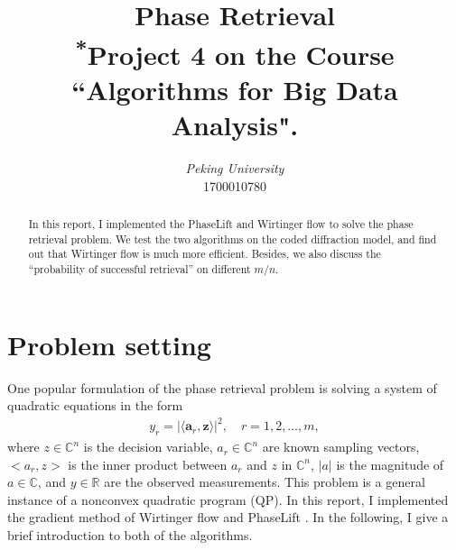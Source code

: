 \documentclass[conference,onecolumn,12pt]{IEEEtran}
\newcommand{\abs}[1]{\left|#1\right|}
\newcommand{\<}{\langle}
\renewcommand{\>}{\rangle}
\newcommand{\vct}[1]{\bm{#1}}
\numberwithin{equation}{section}
\begin{document}
\title{Phase Retrieval\\
{\footnotesize \textsuperscript{*}Project 4 on the Course ``Algorithms for Big Data Analysis".}
}

\author{
\textit{Peking University}\\
1700010780}
\date{}

\maketitle
\thispagestyle{fancy} %
\lhead{} %
\chead{} %
\rhead{} %
\lfoot{} %
\cfoot{} %
\cfoot{\thepage} %
\renewcommand{\headrulewidth}{0pt} %
\renewcommand{\footrulewidth}{1pt} %
\pagestyle{fancy}
\cfoot{\thepage}


\begin{abstract}
  In this report, I implemented the PhaseLift \cite{candes2013phase} and Wirtinger flow \cite{candes2015phase} to solve the phase retrieval problem. We test the two algorithms on the coded diffraction model, and find out that Wirtinger flow is much more efficient. Besides, we also discuss the ``probability of successful retrieval'' on different $m/n$.
\end{abstract}


\tableofcontents
\newpage
\section{Problem setting}
One popular formulation of the phase retrieval problem is solving a system of quadratic equations in the form
\begin{align}
\label{quadeq}
y_r=\abs{\<\vct{a}_r, \vct{z}\>}^2,\quad r=1,2,\ldots,m,
\end{align}
where $z\in \mathbb{C}^n$ is the decision variable, $a_r\in \mathbb{C}^n$ are known sampling vectors, $<a_r,z>$ is the inner product between $a_r$ and $z$ in $\mathbb{C}^n$, $|a|$ is the magnitude of $a\in \mathbb{C}$, and $y\in \mathbb{R}$ are the observed measurements. This problem is a general instance of a nonconvex quadratic program (QP). In this report, I implemented the gradient method of Wirtinger flow \cite{candes2015phase} and PhaseLift \cite{candes2013phase}. In the following, I give a brief introduction to both of the algorithms.
\end{document}
